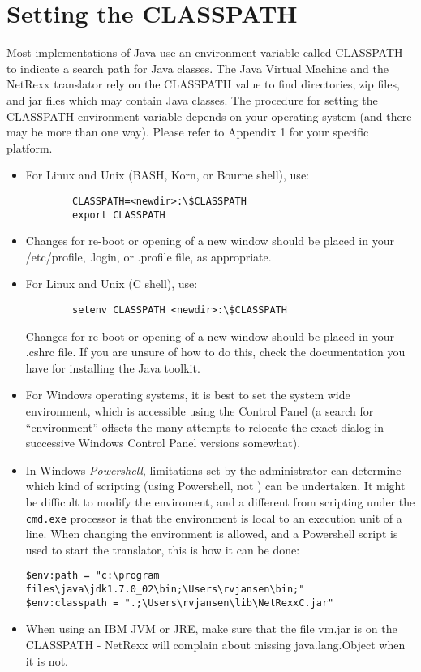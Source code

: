 \section{Setting the CLASSPATH}\label{install_classpath}
Most implementations of Java use an environment variable called CLASSPATH to indicate a search path for Java classes. The Java Virtual Machine and the NetRexx translator rely on the CLASSPATH value to find directories, zip files, and jar files which may contain Java classes. 
The procedure for setting the CLASSPATH environment variable depends on your operating system (and there may be more than one way). Please refer to Appendix 1 for your specific platform.
\begin{itemize}
\item For Linux and Unix (BASH, Korn, or Bourne shell), use:
\begin{verbatim}
        CLASSPATH=<newdir>:\$CLASSPATH 
        export CLASSPATH
\end{verbatim}

\item Changes for re-boot or opening of a new window should be placed in your /etc/profile, .login, or .profile file, as appropriate. 
\item For Linux and Unix (C shell), use:
\begin{verbatim}
        setenv CLASSPATH <newdir>:\$CLASSPATH 
\end{verbatim}
Changes for re-boot or opening of a new window should be placed in
your .cshrc file. If you are unsure of how to do this, check the
documentation you have for installing the Java toolkit.
\item For Windows operating systems, it is best to set the system wide
  environment, which is accessible using the Control Panel (a search
  for ``environment'' offsets the many attempts to relocate the exact
  dialog in successive Windows Control Panel versions somewhat).
\item In Windows \emph{Powershell}, limitations set by the
  administrator can determine which kind of scripting (using
  Powershell, not \nr) can be undertaken. It might be difficult to
  modify the enviroment, and a different from scripting under the
  \texttt{cmd.exe} processor is that the environment is local to an
  execution unit of a line. When changing the environment is allowed,
  and a Powershell script is used to start the \nr translator, this is
  how it can be done:
\begin{verbatim}
$env:path = "c:\program files\java\jdk1.7.0_02\bin;\Users\rvjansen\bin;"
$env:classpath = ".;\Users\rvjansen\lib\NetRexxC.jar"
\end{verbatim}
 \item When using an IBM JVM or JRE, make sure that the file vm.jar is
   on the CLASSPATH - NetRexx will complain about missing
   java.lang.Object when it is not.
\end{itemize}

